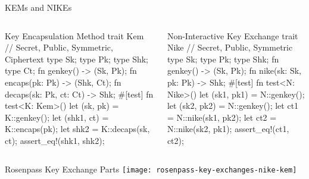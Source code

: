 \begin{frame}[fragile,T]{KEMs and NIKEs}
  \begin{columns}[t,fullwidth]
    \begin{column}{.48\linewidth}
\begin{rustblock}{Key Encapsulation Method}
trait Kem {
  // Secret, Public, Symmetric, Ciphertext
  type Sk; type Pk; type Shk; type Ct;
  fn genkey() -> (Sk, Pk);
  fn encaps(pk: Pk) -> (Shk, Ct);
  fn decaps(sk: Pk, ct: Ct) -> Shk;
}
#[test]
fn test<K: Kem>() {
  let (sk, pk) = K::genkey();
  let (shk1, ct) = K::encaps(pk);
  let shk2 = K::decaps(sk, ct);
  assert_eq!(shk1, shk2);
}
\end{rustblock}
    \end{column}\hfill
    \begin{column}{.48\linewidth}
\begin{rustblock}{Non-Interactive Key Exchange}
trait Nike {
  // Secret, Public, Symmetric
  type Sk; type Pk; type Shk;
  fn genkey() -> (Sk, Pk);
  fn nike(sk: Sk, pk: Pk) -> Shk;
}
#[test]
fn test<N: Nike>() {
  let (sk1, pk1) = N::genkey();
  let (sk2, pk2) = N::genkey();
  let ct1 = N::nike(sk1, pk2);
  let ct2 = N::nike(sk2, pk1);
  assert_eq!(ct1, ct2);
}
\end{rustblock}
    \end{column}

  \end{columns}
\end{frame}

\begin{frame}{Rosenpass Key Exchange Parts}
  \centering
  \texttt{[image: rosenpass-key-exchanges-nike-kem]}
\end{frame}








